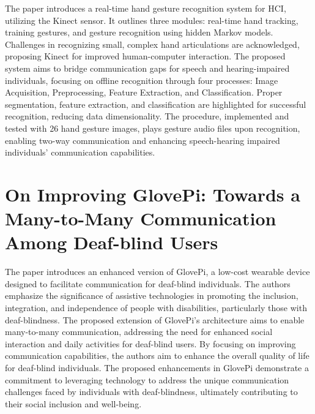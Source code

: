 \documentclass[12pt,a4paper]{report}
\begin{document}
The paper introduces a real-time hand gesture recognition system for HCI, utilizing the Kinect sensor. It outlines three modules: real-time hand tracking, training gestures, and gesture recognition using hidden Markov models. Challenges in recognizing small, complex hand articulations are acknowledged, proposing Kinect for improved human-computer interaction. The proposed system aims to bridge communication gaps for speech and hearing-impaired individuals, focusing on offline recognition through four processes: Image Acquisition, Preprocessing, Feature Extraction, and Classification. Proper segmentation, feature extraction, and classification are highlighted for successful recognition, reducing data dimensionality. The procedure, implemented and tested with 26 hand gesture images, plays gesture audio files upon recognition, enabling two-way communication and enhancing speech-hearing impaired individuals' communication capabilities.

\section{On Improving GlovePi: Towards a Many-to-Many Communication Among Deaf-blind Users }
The paper \cite{ref7} introduces an enhanced version of GlovePi, a low-cost wearable device designed to facilitate communication for deaf-blind individuals. The authors emphasize the significance of assistive technologies in promoting the inclusion, integration, and independence of people with disabilities, particularly those with deaf-blindness. The proposed extension of GlovePi's architecture aims to enable many-to-many communication, addressing the need for enhanced social interaction and daily activities for deaf-blind users. By focusing on improving communication capabilities, the authors aim to enhance the overall quality of life for deaf-blind individuals. The proposed enhancements in GlovePi demonstrate a commitment to leveraging technology to address the unique communication challenges faced by individuals with deaf-blindness, ultimately contributing to their social inclusion and well-being.
\end{document}
